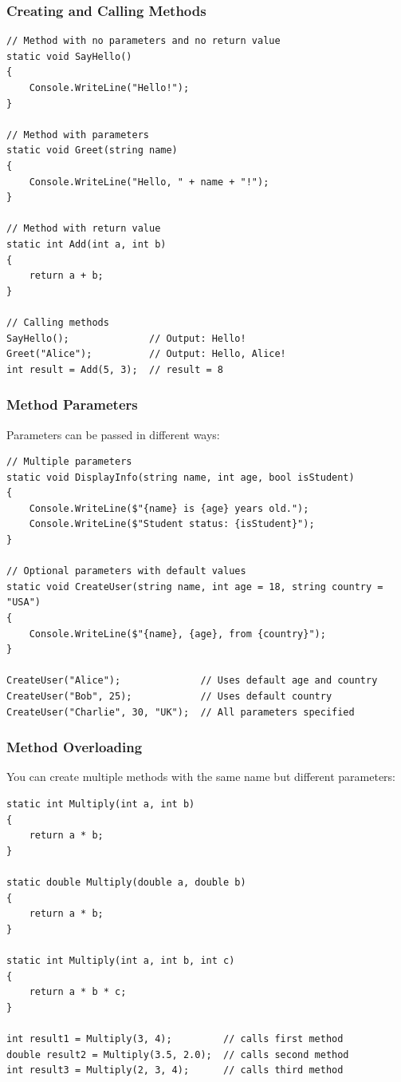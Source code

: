 \documentclass{article}
\begin{document}
\subsubsection{Creating and Calling Methods}
\begin{verbatim}
// Method with no parameters and no return value
static void SayHello()
{
    Console.WriteLine("Hello!");
}

// Method with parameters
static void Greet(string name)
{
    Console.WriteLine("Hello, " + name + "!");
}

// Method with return value
static int Add(int a, int b)
{
    return a + b;
}

// Calling methods
SayHello();              // Output: Hello!
Greet("Alice");          // Output: Hello, Alice!
int result = Add(5, 3);  // result = 8
\end{verbatim}

\subsubsection{Method Parameters}
Parameters can be passed in different ways:

\begin{verbatim}
// Multiple parameters
static void DisplayInfo(string name, int age, bool isStudent)
{
    Console.WriteLine($"{name} is {age} years old.");
    Console.WriteLine($"Student status: {isStudent}");
}

// Optional parameters with default values
static void CreateUser(string name, int age = 18, string country = "USA")
{
    Console.WriteLine($"{name}, {age}, from {country}");
}

CreateUser("Alice");              // Uses default age and country
CreateUser("Bob", 25);            // Uses default country
CreateUser("Charlie", 30, "UK");  // All parameters specified
\end{verbatim}

\subsubsection{Method Overloading}
You can create multiple methods with the same name but different parameters:

\begin{verbatim}
static int Multiply(int a, int b)
{
    return a * b;
}

static double Multiply(double a, double b)
{
    return a * b;
}

static int Multiply(int a, int b, int c)
{
    return a * b * c;
}

int result1 = Multiply(3, 4);         // calls first method
double result2 = Multiply(3.5, 2.0);  // calls second method
int result3 = Multiply(2, 3, 4);      // calls third method
\end{verbatim}
\end{document}

